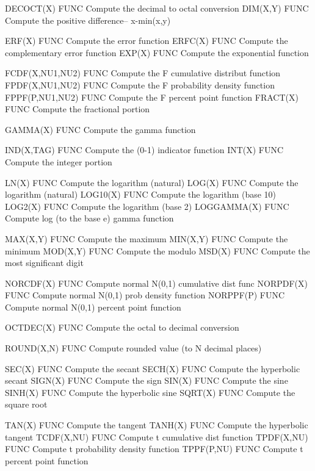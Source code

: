 DECOCT(X)                   FUNC  Compute the decimal to octal conversion
DIM(X,Y)                    FUNC  Compute the positive difference-- x-min(x,y)

ERF(X)                      FUNC  Compute the error function
ERFC(X)                     FUNC  Compute the complementary error function
EXP(X)                      FUNC  Compute the exponential function

FCDF(X,NU1,NU2)             FUNC  Compute the F cumulative distribut function
FPDF(X,NU1,NU2)             FUNC  Compute the F probability density function
FPPF(P,NU1,NU2)             FUNC  Compute the F percent point function
FRACT(X)                    FUNC  Compute the fractional portion

GAMMA(X)                    FUNC  Compute the gamma function

IND(X,TAG)                  FUNC  Compute the (0-1) indicator function
INT(X)                      FUNC  Compute the integer portion

LN(X)                       FUNC  Compute the logarithm (natural)
LOG(X)                      FUNC  Compute the logarithm (natural)
LOG10(X)                    FUNC  Compute the logarithm (base 10)
LOG2(X)                     FUNC  Compute the logarithm (base 2)
LOGGAMMA(X)                 FUNC  Compute log (to the base e) gamma function

MAX(X,Y)                    FUNC  Compute the maximum
MIN(X,Y)                    FUNC  Compute the minimum
MOD(X,Y)                    FUNC  Compute the modulo
MSD(X)                      FUNC  Compute the most significant digit

NORCDF(X)                   FUNC  Compute normal N(0,1) cumulative dist func
NORPDF(X)                   FUNC  Compute normal N(0,1) prob density function
NORPPF(P)                   FUNC  Compute normal N(0,1) percent point function

OCTDEC(X)                   FUNC  Compute the octal to decimal conversion

ROUND(X,N)                  FUNC  Compute rounded value (to N decimal places)

SEC(X)                      FUNC  Compute the secant
SECH(X)                     FUNC  Compute the hyperbolic secant
SIGN(X)                     FUNC  Compute the sign
SIN(X)                      FUNC  Compute the sine
SINH(X)                     FUNC  Compute the hyperbolic sine
SQRT(X)                     FUNC  Compute the square root

TAN(X)                      FUNC  Compute the tangent
TANH(X)                     FUNC  Compute the hyperbolic tangent
TCDF(X,NU)                  FUNC  Compute t cumulative dist function
TPDF(X,NU)                  FUNC  Compute t probability density function
TPPF(P,NU)                  FUNC  Compute t percent point function

